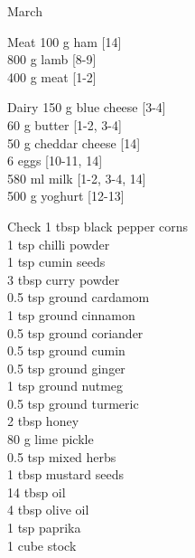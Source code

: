 \begin{menu}{March}
      \begin{shoppinglist}{Meat}
      100 g ham {\scriptsize[14]}\\
      800 g lamb {\scriptsize[8-9]}\\
      400 g meat {\scriptsize[1-2]}\\
      \end{shoppinglist}%
      \begin{shoppinglist}{Dairy}
      150 g blue cheese {\scriptsize[3-4]}\\
      60 g butter {\scriptsize[1-2, 3-4]}\\
      50 g cheddar cheese {\scriptsize[14]}\\
      6  eggs {\scriptsize[10-11, 14]}\\
      580 ml milk {\scriptsize[1-2, 3-4, 14]}\\
      500 g yoghurt {\scriptsize[12-13]}\\
      \end{shoppinglist}%
      \par\vfil %
      \vfil\clearpage %
      \begin{shoppinglist}{Check}
      1 tbsp black pepper corns \\
      1 tsp chilli powder \\
      1 tsp cumin seeds \\
      3 tbsp curry powder \\
      0.5 tsp ground cardamom \\
      1 tsp ground cinnamon \\
      0.5 tsp ground coriander \\
      0.5 tsp ground cumin \\
      0.5 tsp ground ginger \\
      1 tsp ground nutmeg \\
      0.5 tsp ground turmeric \\
      2 tbsp honey \\
      80 g lime pickle \\
      0.5 tsp mixed herbs \\
      1 tbsp mustard seeds \\
      14 tbsp oil \\
      4 tbsp olive oil \\
      1 tsp paprika \\
      1 cube stock \\
      \end{shoppinglist}%

\end{menu}
